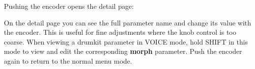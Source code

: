 Pushing the encoder opens the detail page:


On the detail page you can see the full parameter name and change its
value with the encoder. This is useful for fine adjustments where the
knob control is too coarse. When viewing a drumkit parameter in VOICE
mode, hold SHIFT in this mode to view and edit the corresponding
\textbf{morph} parameter. Push the encoder again to return to the normal
menu mode.
